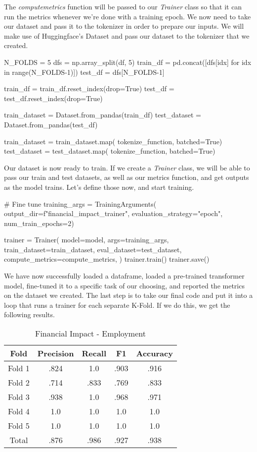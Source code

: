 The \textit{compute\textunderscore metrics} function will be passed to our \textit{Trainer} class so that it can run the metrics whenever we're done with a training epoch. We now need to take our dataset and pass it to the tokenizer in order to prepare our inputs. We will make use of Huggingface's Dataset and pass our dataset to the tokenizer that we created.

\begin{python}
N_FOLDS = 5
dfs = np.array_split(df, 5)
train_df = pd.concat([dfs[idx] for idx in range(N_FOLDS-1)])
test_df = dfs[N_FOLDS-1]

train_df = train_df.reset_index(drop=True)
test_df = test_df.reset_index(drop=True)

train_dataset = Dataset.from_pandas(train_df)
test_dataset = Dataset.from_pandas(test_df)

train_dataset = train_dataset.map(
    tokenize_function, batched=True)
test_dataset = test_dataset.map(
    tokenize_function, batched=True)
\end{python}

Our dataset is now ready to train. If we create a \textit{Trainer} class, we will be able to pass our train and test
datasets, as well as our metrics function, and get outputs as the model trains. Let's define those now, and start training.

\begin{python}
# Fine tune
training_args = TrainingArguments(
    output_dir=f"financial_impact_trainer",
    evaluation_strategy="epoch",
    num_train_epochs=2)

trainer = Trainer(
    model=model,
    args=training_args,
    train_dataset=train_dataset,
    eval_dataset=test_dataset,
    compute_metrics=compute_metrics,
)
trainer.train()
trainer.save()
\end{python}

We have now successfully loaded a dataframe, loaded a pre-trained transformer model, fine-tuned it to a specific task
of our choosing, and reported the metrics on the dataset we created. The last step is to take our final code and put
it into a loop that runs a trainer for each separate K-Fold. If we do this, we get the following results.

\begin{table}[htbp]
    \centering
    \caption{Financial Impact - Employment}
    \begin{tabular}{|c|c|c|c|c|}
        \hline
        Fold & Precision & Recall & F1 & Accuracy \\
        \hline
        Fold 1 & .824 & 1.0 & .903 & .916 \\
        \hline
        Fold 2 & .714 & .833 & .769 & .833 \\
        \hline
        Fold 3 & .938 & 1.0 & .968 & .971 \\
        \hline
        Fold 4 & 1.0 & 1.0 & 1.0 & 1.0 \\
        \hline
        Fold 5 & 1.0 & 1.0 & 1.0 & 1.0 \\
        \hline
        Total & .876 & .986 & .927 & .938 \\
        \hline
    \end{tabular}
\end{table}

